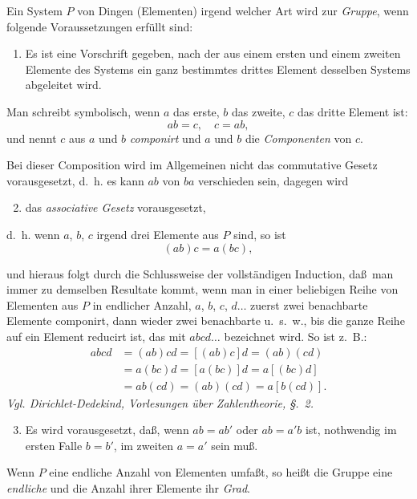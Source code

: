 \documentclass[12pt,a4paper]{book}
\begin{document}
Ein System $P$ von Dingen (Elementen) irgend welcher Art wird zur \textit{Gruppe}, wenn folgende Voraussetzungen erf\"ullt sind:

\begin{enumerate}
\item Es ist eine Vorschrift gegeben, nach der aus einem ersten und einem zweiten Elemente des Systems ein ganz bestimmtes drittes Element desselben Systems abgeleitet wird.
\end{enumerate}

Man schreibt symbolisch, wenn $a$ das erste, $b$ das zweite, $c$ das dritte Element ist:
\[ab = c,\quad c = ab,\]
und nennt $c$ aus $a$ und $b$ \textit{componirt} und $a$ und $b$ die \textit{Componenten} von $c$.

Bei dieser Composition wird im Allgemeinen nicht das commutative Gesetz vorausgesetzt, d.~h. es kann $ab$ von $ba$ verschieden sein, dagegen wird

\begin{enumerate}
\setcounter{enumi}{1}
\item das \textit{associative Gesetz} vorausgesetzt,
\end{enumerate}
d.~h. wenn $a$, $b$, $c$ irgend drei Elemente aus $P$ sind, so ist
\[(ab)c = a(bc),\]

und hieraus folgt durch die Schlussweise der vollst\"andigen Induction, da\ss\ man immer zu demselben Resultate kommt, wenn man in einer beliebigen Reihe von Elementen aus $P$ in endlicher Anzahl, $a$, $b$, $c$, $d \ldots$ zuerst zwei benachbarte Elemente componirt, dann wieder zwei benachbarte u.~s.~w., bis die ganze Reihe auf ein Element reducirt ist, das mit $abcd\ldots$ bezeichnet wird. So ist z.~B.:
\begin{align*}
abcd &= (ab)cd = [(ab)c]d = (ab)(cd) \\
     &= a(bc)d = [a(bc)]d = a[(bc)d] \\
     &= ab(cd) = (ab)(cd) = a[b(cd)].
\end{align*}
\textit{Vgl. Dirichlet-Dedekind, Vorlesungen \"uber Zahlentheorie, \S.~2.}

\begin{enumerate}
\setcounter{enumi}{2}
\item Es wird vorausgesetzt, da\ss, wenn $ab = ab'$ oder $ab = a'b$ ist, nothwendig im ersten Falle $b = b'$, im zweiten $a = a'$ sein mu\ss.
\end{enumerate}

Wenn $P$ eine endliche Anzahl von Elementen umfa\ss t, so hei\ss t die Gruppe eine \textit{endliche} und die Anzahl ihrer Elemente ihr \textit{Grad}.
\end{document}
